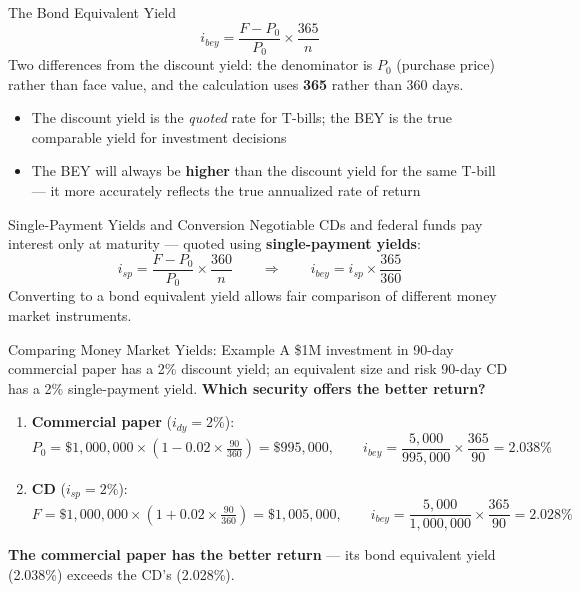 \documentclass[aspectratio=169]{beamer}
\begin{document}
\begin{frame}{The Bond Equivalent Yield}
\[
i_{bey} = \frac{F - P_0}{P_0} \times \frac{365}{n}
\]
Two differences from the discount yield: the denominator is $P_0$ (purchase price) rather than face value, and the calculation uses \textbf{365} rather than 360 days.
\vspace{0.3em}
\begin{itemize}
  \item The discount yield is the \emph{quoted} rate for T-bills; the BEY is the true comparable yield for investment decisions
  \item The BEY will always be \textbf{higher} than the discount yield for the same T-bill --- it more accurately reflects the true annualized rate of return
\end{itemize}
\end{frame}

\begin{frame}{Single-Payment Yields and Conversion}
Negotiable CDs and federal funds pay interest only at maturity --- quoted using \textbf{single-payment yields}:
\[
i_{sp} = \frac{F - P_0}{P_0} \times \frac{360}{n}
\qquad\Longrightarrow\qquad
i_{bey} = i_{sp} \times \frac{365}{360}
\]
Converting to a bond equivalent yield allows fair comparison of different money market instruments.
\end{frame}

\begin{frame}{Comparing Money Market Yields: Example}
A \$1M investment in 90-day commercial paper has a 2\% discount yield; an equivalent size and risk 90-day CD has a 2\% single-payment yield. \textbf{Which security offers the better return?}
\vspace{0.3em}
\begin{enumerate}
  \item \textbf{Commercial paper} ($i_{dy} = 2\%$):
  \[
  P_0 = \$1{,}000{,}000 \times \left(1 - 0.02 \times \tfrac{90}{360}\right) = \$995{,}000,
  \qquad
  i_{bey} = \frac{5{,}000}{995{,}000} \times \frac{365}{90} = 2.038\%
  \]
  \item \textbf{CD} ($i_{sp} = 2\%$):
  \[
  F = \$1{,}000{,}000 \times \left(1 + 0.02 \times \tfrac{90}{360}\right) = \$1{,}005{,}000,
  \qquad
  i_{bey} = \frac{5{,}000}{1{,}000{,}000} \times \frac{365}{90} = 2.028\%
  \]
\end{enumerate}
\textbf{The commercial paper has the better return} --- its bond equivalent yield (2.038\%) exceeds the CD's (2.028\%).
\end{frame}
\end{document}

